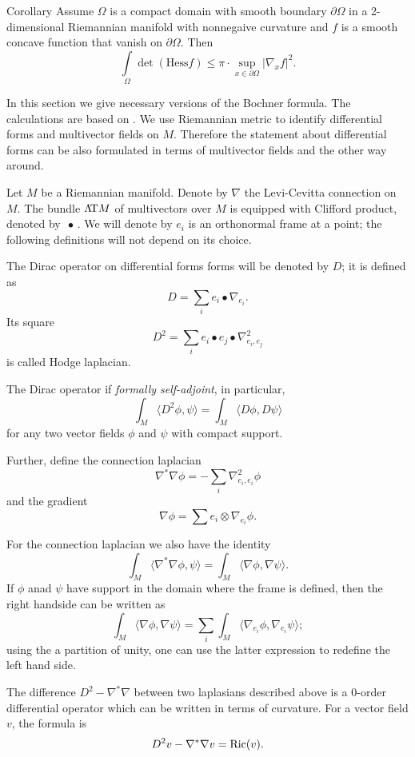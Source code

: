 \documentclass[a4paper,10pt]{article}
\begin{document}
\begin{thm}{Corollary}
Assume $\Omega$ is a compact domain with smooth boundary $\partial \Omega$ in a 2-dimensional Riemannian manifold with nonnegaive curvature
and $f$ is a smooth concave function that vanish on $\partial \Omega$.
Then
\[\int\limits_\Omega 
\det(\mathrm{Hess}f)
\le\pi\cdot\sup_{x\in\partial\Omega}|\nabla_x f|^2.\]

\end{thm}




In this section we give necessary versions of the Bochner formula.
The calculations are based on \cite[Chapter II]{lawson-michelsohn}.
We use Riemannian metric to identify differential forms and multivector fields on $M$.
Therefore the statement about differential forms can be also formulated in terms of multivector fields and the other way around.


Let $M$ be a Riemannian manifold.
Denote by $\nabla$ the Levi-Cevitta connection on $M$.
The bundle $\Lambda\!\mathrm{T} M$ of multivectors over $M$ is equipped with Clifford product, denoted by $\,\bullet \,$.
We will denote by $e_i$ is an orthonormal frame at a point; the following definitions will not depend on its choice.

The Dirac operator on differential forms forms will be denoted by $D$;
it is defined as
\[D=\sum_i e_i\bullet \nabla_{e_i}.\]
Its square 
\[D^2=\sum_i e_i\bullet e_j\bullet \nabla^2_{e_i,e_j}\]
is called Hodge laplacian.

The Dirac operator if \emph{formally self-adjoint}, in particular,
\[\int_M \langle D^2\phi,\psi\rangle=\int_M \langle D\phi,D\psi\rangle\]
for any two vector fields $\phi$ and $\psi$ with compact support.

Further, define the connection laplacian
\[\nabla^*\nabla\phi =-\sum_i\nabla^2_{e_i,e_i}\phi\]
and the gradient
\[\nabla \phi=\sum e_i\otimes \nabla_{e_i}\phi.\]

For the connection laplacian we also have the identity
\[\int_M \langle \nabla^*\nabla\phi,\psi\rangle
=
\int_M \langle \nabla\phi,\nabla\psi\rangle.\]
If $\phi$ anad $\psi$ have support in the domain where the frame is defined, then the right handside can be written as 
\[\int_M \langle \nabla\phi,\nabla\psi\rangle=\sum_i\int_M\langle \nabla_{e_i}\phi,\nabla_{e_i}\psi\rangle;\]
using the a partition of unity, one can use the latter expression to redefine the left hand side. 

The difference $D^2-\nabla^*\nabla$ between two laplasians described above is a 0-order differential operator which can be written in terms of curvature.
For a vector field $v$, the formula is 
\[D^2v-\nabla^*\nabla v=\operatorname{Ric}(v).\]
\end{document}
